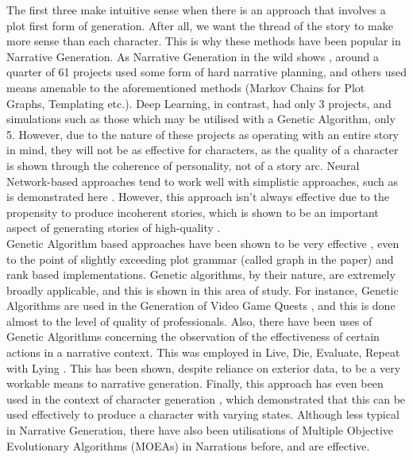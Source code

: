 \documentclass[11pt]{article}
\begin{document}
The first three make intuitive sense when there is an approach that involves a plot first form of generation. After all, we want the thread of the story to make more sense than each character. This is why these methods have been popular in Narrative Generation. As Narrative Generation in the wild shows \cite{van-stegeren-theune-2019-narrative}, around a quarter of 61 projects used some form of hard narrative planning, and others used means amenable to the aforementioned methods (Markov Chains for Plot Graphs, Templating etc.). Deep Learning, in contrast, had only 3 projects, and simulations such as those which may be utilised with a Genetic Algorithm, only 5. However, due to the nature of these projects as operating with an entire story in mind, they will not be as effective for characters, as the quality of a character is shown through the coherence of personality, not of a story arc. Neural Network-based approaches tend to work well with simplistic approaches, such as is demonstrated here \cite{NeuralNetworkOne}. However, this approach isn't always effective due to the propensity to produce incoherent stories, which is shown to be an important aspect of generating stories of high-quality \cite{sagarkar-etal-2018-quality}. \\

Genetic Algorithm based approaches have been shown to be very effective \cite{mcintyre-lapata-2010-plot}, even to the point of slightly exceeding plot grammar (called graph in the paper) and rank based implementations. Genetic algorithms, by their nature, are extremely broadly applicable, and this is shown in this area of study. For instance, Genetic Algorithms are used in the Generation of Video Game Quests \cite{questgeneration}, and this is done almost to the level of quality of professionals. Also, there have been uses of Genetic Algorithms concerning the observation of the effectiveness of certain actions in a narrative context. This was employed in Live, Die, Evaluate, Repeat with Lying \cite{Riegl2018LiveDE}. This has been shown, despite reliance on exterior data, to be a very workable means to narrative generation. Finally, this approach has even been used in the context of character generation \cite{charactergeneration}, which demonstrated that this can be used effectively to produce a character with varying states. Although less typical in Narrative Generation, there have also been utilisations of Multiple Objective Evolutionary Algorithms (MOEAs) in Narrations before\cite{MOEANarrative}, and are effective.   
\end{document}
